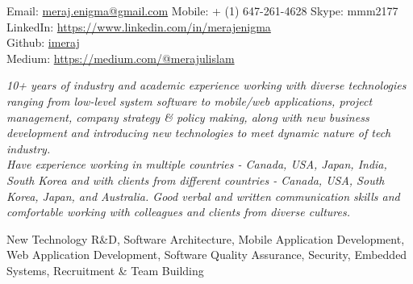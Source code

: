 \documentclass[10pt,a4paper]{article} %
\begin{document}


\noindent Email: \href{mailto:meraj.enigma@gmail.com}{meraj.enigma@gmail.com}\bull
\textsmaller Mobile: {+} (1) 647-261-4628 \bull Skype: mmm2177\\
LinkedIn: \href{https://www.linkedin.com/in/merajenigma}{https://www.linkedin.com/in/merajenigma}\\
Github: \href{https://github.com/imeraj}{imeraj} \\
Medium: \href{https://medium.com/@merajulislam} {https://medium.com/@merajulislam}


\spacedhrule{0.9em}{-0.4em} %



\vspace{-1.3em} %

\begin{multicols}{2}  %
\noindent \textit{10+ years of industry and academic experience working with diverse technologies ranging from low-level system software to mobile/web applications, project management, company strategy \& policy making, along with new business development and introducing new technologies to meet dynamic nature of tech industry.\\
Have experience working in multiple countries - Canada, USA, Japan, India, South Korea and with clients from different countries - Canada, USA, South Korea, Japan, and Australia. Good verbal and written communication skills and comfortable working with colleagues and clients from diverse cultures.}
\end{multicols}

 New Technology R\&D, Software Architecture, Mobile Application Development, Web Application Development, Software Quality Assurance, Security, Embedded Systems, Recruitment \& Team Building\\
\end{document}
